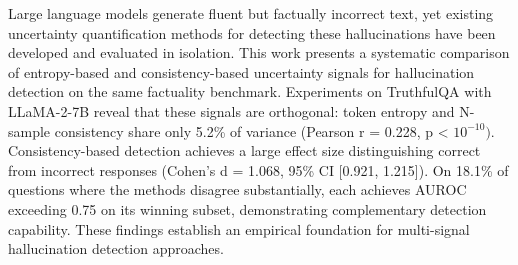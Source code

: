 
Large language models generate fluent but factually incorrect text, yet existing uncertainty quantification methods for detecting these hallucinations have been developed and evaluated in isolation. This work presents a systematic comparison of entropy-based and consistency-based uncertainty signals for hallucination detection on the same factuality benchmark. Experiments on TruthfulQA with LLaMA-2-7B reveal that these signals are orthogonal: token entropy and N-sample consistency share only 5.2\% of variance (Pearson r = 0.228, p < $10^{-10})$. Consistency-based detection achieves a large effect size distinguishing correct from incorrect responses (Cohen's d = 1.068, 95\% CI [0.921, 1.215]). On 18.1\% of questions where the methods disagree substantially, each achieves AUROC exceeding 0.75 on its winning subset, demonstrating complementary detection capability. These findings establish an empirical foundation for multi-signal hallucination detection approaches.

